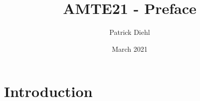 \documentclass{article}
\title{AMTE21 - Preface}
\author{Patrick Diehl}
\date{March 2021}
\begin{document}
\maketitle

\section{Introduction}
\end{document}

